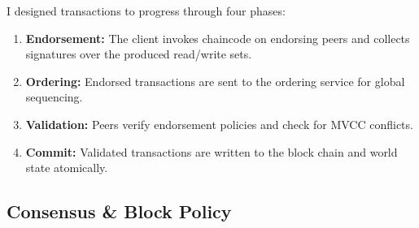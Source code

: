 \documentclass[12pt]{article}
\begin{document}
I designed transactions to progress through four phases:

\begin{enumerate}
\item \textbf{Endorsement:} The client invokes chaincode on endorsing peers and collects signatures over the produced read/write sets.
\item \textbf{Ordering:} Endorsed transactions are sent to the ordering service for global sequencing.
\item \textbf{Validation:} Peers verify endorsement policies and check for MVCC conflicts.
\item \textbf{Commit:} Validated transactions are written to the block chain and world state atomically.
\end{enumerate}

\subsection{Consensus \& Block Policy}
\end{document}
